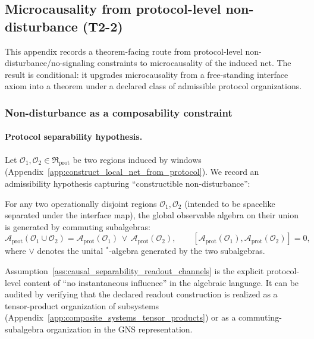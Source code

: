 \subsection{Microcausality from protocol-level non-disturbance (T2-2)}
\label{app:microcausality_from_protocol_non_disturbance}

\AuditTag This appendix records a theorem-facing route from protocol-level non-disturbance/no-signaling constraints to microcausality of the induced net.
The result is conditional: it upgrades microcausality from a free-standing interface axiom into a theorem under a declared class of admissible protocol organizations.

\subsubsection{Non-disturbance as a composability constraint}
\paragraph{Protocol separability hypothesis.}
Let $\mathcal{O}_1,\mathcal{O}_2\in\mathfrak{R}_{\mathrm{prot}}$ be two regions induced by windows (Appendix~\ref{app:construct_local_net_from_protocol}).
We record an admissibility hypothesis capturing ``constructible non-disturbance'':

\begin{assumption}
\label{ass:causal_separability_readout_channels}
For any two operationally disjoint regions $\mathcal{O}_1,\mathcal{O}_2$ (intended to be spacelike separated under the interface map), the global observable algebra on their union is generated by commuting subalgebras:
\[
\mathcal{A}_{\mathrm{prot}}(\mathcal{O}_1\cup\mathcal{O}_2)
=
\mathcal{A}_{\mathrm{prot}}(\mathcal{O}_1)\,\vee\,\mathcal{A}_{\mathrm{prot}}(\mathcal{O}_2),
\qquad
[\mathcal{A}_{\mathrm{prot}}(\mathcal{O}_1),\mathcal{A}_{\mathrm{prot}}(\mathcal{O}_2)]=0,
\]
where $\vee$ denotes the unital $^\ast$-algebra generated by the two subalgebras.
\end{assumption}

\AuditTag Assumption~\ref{ass:causal_separability_readout_channels} is the explicit protocol-level content of ``no instantaneous influence'' in the algebraic language.
It can be audited by verifying that the declared readout construction is realized as a tensor-product organization of subsystems (Appendix~\ref{app:composite_systems_tensor_products}) or as a commuting-subalgebra organization in the GNS representation.

